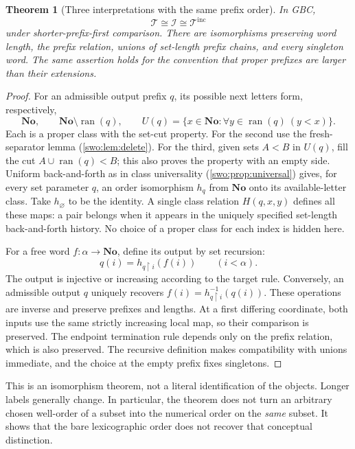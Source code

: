 \documentclass[11pt]{article}
\newtheorem{theorem}{Theorem}[section]
\theoremstyle{definition}
\theoremstyle{remark}
\newcommand{\No}{\mathbf{No}}
\newcommand{\Words}{\mathcal I}
\newcommand{\WordsAll}{\mathcal T}
\newcommand{\ran}{\operatorname{ran}}
\newcommand{\res}{\mathbin{\upharpoonright}}
\newcommand{\WordsInc}{\mathcal T^{\mathrm{inc}}}
\begin{document}
\begin{theorem}[Three interpretations with the same prefix order]
\label{swo:ds:thm:wordisomorphism}
In GBC,
\[
 \WordsAll\cong \Words\cong \WordsInc
\]
under shorter-prefix-first comparison. There are isomorphisms preserving
word length, the prefix relation, unions of set-length prefix chains, and
every singleton word. The same assertion holds for the convention that
proper prefixes are larger than their extensions.
\end{theorem}
\begin{proof}
For an admissible output prefix $q$, its possible next letters form,
respectively,
\[
 \No,\qquad \No\setminus\ran(q),\qquad
 U(q)=\{x\in\No:\forall y\in\ran(q)\ (y<x)\}.
\]
Each is a proper class with the set-cut property. For the second use
the fresh-separator lemma (\cref{swo:lem:delete}). For the third, given sets $A<B$ in $U(q)$,
fill the cut $A\cup\ran(q)<B$; this also proves the property with an
empty side. Uniform back-and-forth as in
class universality (\cref{swo:prop:universal}) gives, for every set parameter $q$, an
order isomorphism $h_q$ from $\No$ onto its available-letter class.
Take $h_\varnothing$ to be the identity. A single class relation
$H(q,x,y)$ defines all these maps: a pair belongs when it appears in the
uniquely specified set-length back-and-forth history. No choice of a
proper class for each index is hidden here.

For a free word $f:\alpha\to\No$, define its output by set recursion:
\[
 q(i)=h_{q\res i}(f(i))\qquad(i<\alpha).
\]
The output is injective or increasing according to the target rule.
Conversely, an admissible output $q$ uniquely recovers
$f(i)=h_{q\res i}^{-1}(q(i))$. These operations are inverse and preserve
prefixes and lengths. At a first differing coordinate, both inputs use
the same strictly increasing local map, so their comparison is preserved.
The endpoint termination rule depends only on the prefix relation, which
is also preserved. The recursive definition makes compatibility with
unions immediate, and the choice at the empty prefix fixes singletons.
\end{proof}

This is an isomorphism theorem, not a literal identification of the objects.
Longer labels generally change. In particular, the theorem does not turn
an arbitrary chosen well-order of a subset into the numerical order on
the \emph{same} subset. It shows that the bare lexicographic order does not
recover that conceptual distinction.
\end{document}
